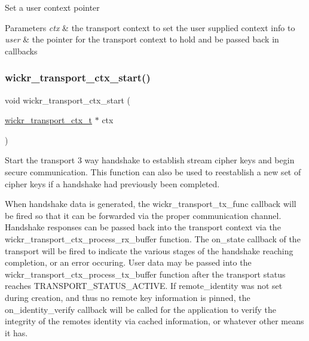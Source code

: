 Set a user context pointer


\begin{DoxyParams}{Parameters}
{\em ctx} & the transport context to set the user supplied context info to \\
\hline
{\em user} & the pointer for the transport context to hold and be passed back in callbacks \\
\hline
\end{DoxyParams}
\mbox{\label{group__wickr__transport__ctx_gaee74761e31d5f0a6fc97e2ccf5ac1e29}} 
\subsubsection{\texorpdfstring{wickr\_transport\_ctx\_start()}{wickr\_transport\_ctx\_start()}}
{\footnotesize\ttfamily void wickr\+\_\+transport\+\_\+ctx\+\_\+start (\begin{DoxyParamCaption}\item[{\mbox{\hyperlink{structwickr__transport__ctx}{wickr\+\_\+transport\+\_\+ctx\+\_\+t}} $\ast$}]{ctx }\end{DoxyParamCaption})}

Start the transport 3 way handshake to establish stream cipher keys and begin secure communication. This function can also be used to reestablish a new set of cipher keys if a handshake had previously been completed.

When handshake data is generated, the \textquotesingle{}wickr\+\_\+transport\+\_\+tx\+\_\+func\textquotesingle{} callback will be fired so that it can be forwarded via the proper communication channel. Handshake responses can be passed back into the transport context via the \textquotesingle{}wickr\+\_\+transport\+\_\+ctx\+\_\+process\+\_\+rx\+\_\+buffer\textquotesingle{} function. The \textquotesingle{}on\+\_\+state\textquotesingle{} callback of the transport will be fired to indicate the various stages of the handshake reaching completion, or an error occuring. User data may be passed into the \textquotesingle{}wickr\+\_\+transport\+\_\+ctx\+\_\+process\+\_\+tx\+\_\+buffer\textquotesingle{} function after the transport status reaches \textquotesingle{}T\+R\+A\+N\+S\+P\+O\+R\+T\+\_\+\+S\+T\+A\+T\+U\+S\+\_\+\+A\+C\+T\+I\+VE\textquotesingle{}. If \textquotesingle{}remote\+\_\+identity\textquotesingle{} was not set during creation, and thus no remote key information is pinned, the \textquotesingle{}on\+\_\+identity\+\_\+verify\textquotesingle{} callback will be called for the application to verify the integrity of the remote\textquotesingle{}s identity via cached information, or whatever other means it has.

